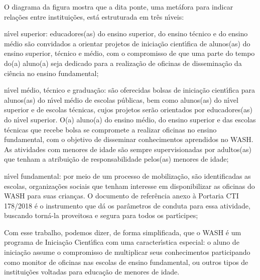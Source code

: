 \documentclass[
12pt,		%
openright,	%
twoside,  %
a4paper,			%
chapter=TITLE,		%
english,			%
french,				%
spanish,			%
brazil				%
]{USPSC-classe/USPSC}
\begin{document}
O diagrama da figura mostra que a dita \textquotedbl ponte\textquotedbl , uma met\'afora para indicar rela\c{c}\~oes entre institui\c{c}\~oes, est\'a estruturada em tr\^es n\'{\i}veis:











\begin{alineas}
\item n\'{\i}vel superior: educadores(as) do ensino superior, do ensino t\'ecnico e do ensino m\'edio s\~ao convidados a orientar projetos de inicia\c{c}\~ao cient\'{\i}fica de alunos(as) do ensino superior, t\'ecnico e m\'edio, com o compromisso de que uma parte do tempo do(a) aluno(a) seja dedicado para a realiza\c{c}\~ao de oficinas de dissemina\c{c}\~ao da ci\^encia no ensino fundamental;
\item n\'{\i}vel m\'edio, t\'ecnico e gradua\c{c}\~ao: s\~ao oferecidas bolsas de inicia\c{c}\~ao cient\'{\i}fica para alunos(as) do n\'{\i}vel m\'edio de escolas p\'ublicas, bem como alunos(as) do n\'{\i}vel superior e de escolas t\'ecnicas, cujos projetos ser\~ao orientados por educadores(as) do n\'{\i}vel superior. O(a) aluno(a) do ensino m\'edio, do ensino superior e das escolas t\'ecnicas que recebe bolsa se compromete a realizar oficinas no ensino fundamental, com o objetivo de disseminar conhecimentos aprendidos no WASH. As atividades com menores de idade s\~ao sempre supervisionadas por adultos(as) que tenham a  atribui\c{c}\~ao de responsabilidade pelos(as) menores de idade;
\item n\'{\i}vel fundamental: por meio de um processo de mobiliza\c{c}\~ao, s\~ao identificadas as escolas, organiza\c{c}\~oes sociais que tenham interesse em disponibilizar as oficinas do WASH para suas crian\c{c}as. O documento de refer\^encia anexo \`a Portaria CTI 178/2018 \'e o instrumento que d\'a os par\^ametros de conduta para essa atividade, buscando torn\'a-la proveitosa e segura para todos os part\'{\i}cipes;
\end{alineas}

Com esse trabalho, podemos dizer, de forma simplificada, que o WASH \'e um programa de Inicia\c{c}\~ao Cient\'{\i}fica com uma caracter\'{\i}stica especial: o aluno de inicia\c{c}\~ao assume o compromisso de multiplicar seus conhecimentos participando como monitor de oficinas nas escolas de ensino fundamental, ou outros tipos de institui\c{c}\~oes voltadas para educa\c{c}\~ao de menores de idade.
\end{document}
